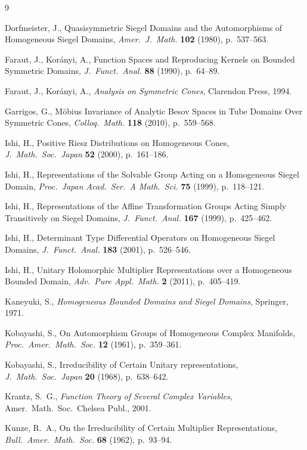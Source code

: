 \documentclass[10.5pt,reqno]{amsart}
\begin{document}
\begin{thebibliography}{9}
	
	Dorfmeister, J., Quasisymmetric Siegel Domains and the Automorphisms of Homogeneous Siegel Domains, \emph{Amer.\ J.\ Math.} \textbf{102} (1980), p.~537--563.
	
	Faraut, J., Kor\'anyi, A., Function Spaces and Reproducing Kernels on Bounded Symmetric Domains, \emph{J.\ Funct.\ Anal.} \textbf{88} (1990), p.~64--89.
	
	Faraut, J., Kor\'anyi, A., \emph{Analysis on Symmetric Cones}, Clarendon Press, 1994.
	
	
	Garrigos, G., M\"obius Invariance of Analytic Besov Spaces in Tube Domains Over Symmetric Cones, \emph{Colloq.\ Math.} \textbf{118} (2010), p.~559--568.
	
	
	Ishi, H., Positive Riesz Distributions on Homogeneous Cones, \emph{J.\ Math.\ Soc.\ Japan} \textbf{52} (2000), p.~161--186.
	
	Ishi, H., Representations of the Solvable Group Acting on a Homogeneous Siegel Domain, \emph{Proc.\ Japan Acad.\ Ser.\ A Math.\ Sci.} \textbf{75} (1999), p.~118--121.
	
	Ishi, H., Representations of the Affine Transformation Groups Acting Simply Transitively on Siegel Domains, \emph{J.\ Funct.\ Anal.} \textbf{167} (1999), p.~425--462.
	
	Ishi, H., Determinant Type Differential Operators on Homogeneous Siegel Domains, \emph{J.\ Funct.\ Anal.} \textbf{183} (2001), p.~526--546.
	
	Ishi, H., Unitary Holomorphic Multiplier Representations over a Homogeneous Bounded Domain, \emph{Adv.\ Pure Appl.\ Math.} \textbf{2} (2011), p.~405--419.
	
	
	Kaneyuki, S., \emph{Homogeneous Bounded Domains and Siegel Domains}, Springer, 1971.
	
	Kobayashi, S., On Automorphism Groups of Homogeneous Complex Manifolds, \emph{Proc.\ Amer.\ Math.\ Soc.} \textbf{12} (1961), p.~359--361.
	
	Kobayashi, S., Irreducibility of Certain Unitary representations, \emph{J.\ Math.\ Soc.\ Japan} \textbf{20} (1968), p.~638--642.
	
	Krantz, S.\ G., \emph{Function Theory of Several Complex Variables}, Amer.\ Math.\ Soc.\ Chelsea Publ., 2001. 
	
	Kunze, R.\ A., On the Irreducibility of Certain Multiplier Representations, \emph{Bull.\ Amer.\ Math.\ Soc.} \textbf{68} (1962), p.~93--94.
	

\end{thebibliography}
\end{document}
